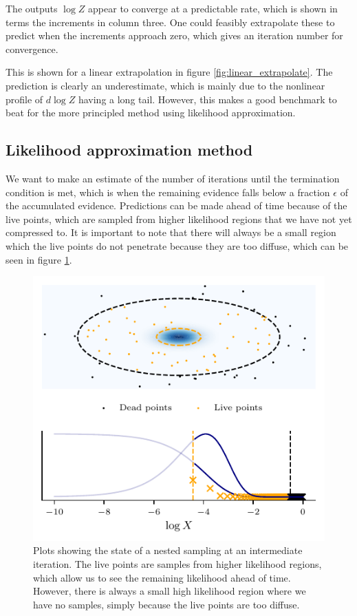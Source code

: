 \documentclass[usenatbib]{mnras}
\begin{document}
The outputs $\log Z$ appear to converge at a predictable rate, which is shown in terms the increments in column three. One could feasibly extrapolate these to predict when the increments approach zero, which gives an iteration number for convergence. 
\par
This is shown for a linear extrapolation in figure \ref{fig:linear_extrapolate}. The prediction is clearly an underestimate, which is mainly due to the nonlinear profile of $d\log Z$ having a long tail. However, this makes a good benchmark to beat for the more principled method using likelihood approximation. 

\subsection{Likelihood approximation method}
We want to make an estimate of the number of iterations until the termination condition is met, which is when the remaining evidence falls below a fraction $\epsilon$ of the accumulated evidence.
Predictions can be made ahead of time because of the live points, which are sampled from higher likelihood regions that we have not yet compressed to. It is important to note that there will always be a small region which the live points do not penetrate because they are too diffuse, which can be seen in figure \ref{fig:dead_live_points}. 
\begin{figure}
\begin{center}
	\includegraphics{Figures/dead_live_points.pdf}
\end{center}
\caption{Plots showing the state of a nested sampling at an intermediate iteration. The live points are samples from higher likelihood regions, which allow us to see the remaining likelihood ahead of time. However, there is always a small high likelihood region where we have no samples, simply because the live points are too diffuse.}
\label{fig:dead_live_points}
\end{figure}
\end{document}
